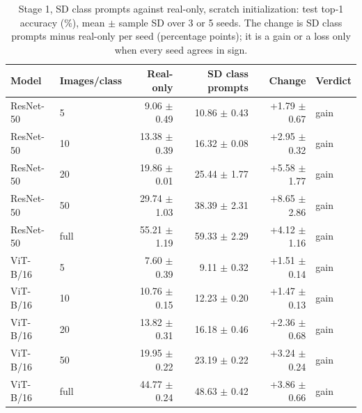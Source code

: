 \begin{table}[H]
\centering
\caption{Stage 1, SD class prompts against real-only, scratch initialization: test top-1 accuracy (\%), mean $\pm$ sample SD over 3 or 5 seeds. The change is SD class prompts minus real-only per seed (percentage points); it is a gain or a loss only when every seed agrees in sign.}
\label{tab:stage1-scratch-accuracy-sd_prompt-test}
\begin{tabular}{llrrrl}
\toprule
Model & Images/class & Real-only & SD class prompts & Change & Verdict \\
\midrule
ResNet-50 & 5 & 9.06 $\pm$ 0.49 & 10.86 $\pm$ 0.43 & +1.79 $\pm$ 0.67 & gain \\
ResNet-50 & 10 & 13.38 $\pm$ 0.39 & 16.32 $\pm$ 0.08 & +2.95 $\pm$ 0.32 & gain \\
ResNet-50 & 20 & 19.86 $\pm$ 0.01 & 25.44 $\pm$ 1.77 & +5.58 $\pm$ 1.77 & gain \\
ResNet-50 & 50 & 29.74 $\pm$ 1.03 & 38.39 $\pm$ 2.31 & +8.65 $\pm$ 2.86 & gain \\
ResNet-50 & full & 55.21 $\pm$ 1.19 & 59.33 $\pm$ 2.29 & +4.12 $\pm$ 1.16 & gain \\
\midrule
ViT-B/16 & 5 & 7.60 $\pm$ 0.39 & 9.11 $\pm$ 0.32 & +1.51 $\pm$ 0.14 & gain \\
ViT-B/16 & 10 & 10.76 $\pm$ 0.15 & 12.23 $\pm$ 0.20 & +1.47 $\pm$ 0.13 & gain \\
ViT-B/16 & 20 & 13.82 $\pm$ 0.31 & 16.18 $\pm$ 0.46 & +2.36 $\pm$ 0.68 & gain \\
ViT-B/16 & 50 & 19.95 $\pm$ 0.22 & 23.19 $\pm$ 0.22 & +3.24 $\pm$ 0.24 & gain \\
ViT-B/16 & full & 44.77 $\pm$ 0.24 & 48.63 $\pm$ 0.42 & +3.86 $\pm$ 0.66 & gain \\
\bottomrule
\end{tabular}
\end{table}
